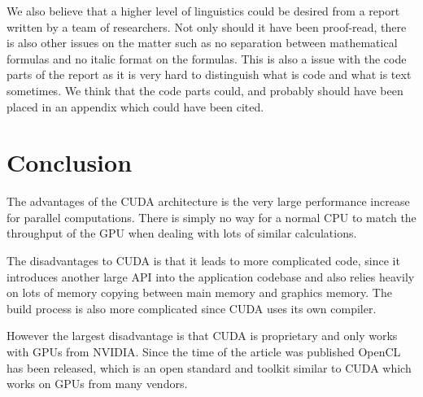 \documentclass[titlepage, a4paper]{article}
\begin{document}
We also believe that a higher level of linguistics could be desired from a report written by a team of researchers. Not only should it have been proof-read, there is also other issues on the matter such as no separation between mathematical formulas and no italic format on the formulas. This is also a issue with the code parts of the report as it is very hard to distinguish what is code and what is text sometimes. We think that the code parts could, and probably should have been placed in an appendix which could have been cited.

\section{Conclusion}\label{sec:conclusion}
The advantages of the CUDA architecture is the very large performance increase for parallel computations. There is simply no way for a normal CPU to match the throughput of the GPU when dealing with lots of similar calculations.

The disadvantages to CUDA is that it leads to more complicated code, since it introduces another large API into the application codebase and also relies heavily on lots of memory copying between main memory and graphics memory. The build process is also more complicated since CUDA uses its own compiler.

However the largest disadvantage is that CUDA is proprietary and only works with GPUs from NVIDIA. Since the time of the article was published OpenCL has been released, which is an open standard and toolkit similar to CUDA which works on GPUs from many vendors.
\end{document}
